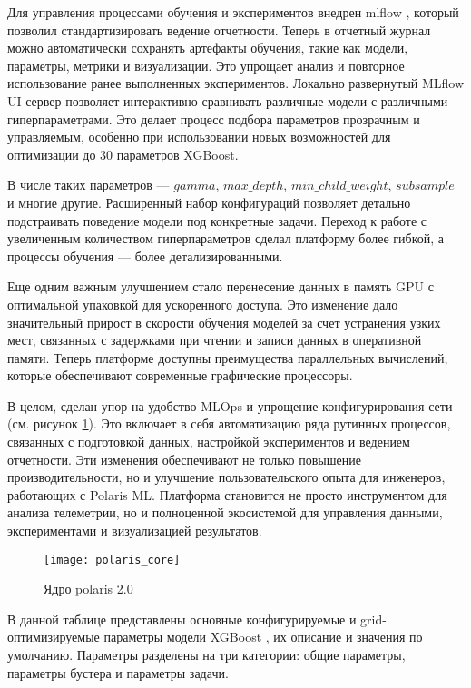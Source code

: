 Для управления процессами обучения и экспериментов внедрен mlflow \cite{mlflow_docs}, который позволил стандартизировать ведение отчетности. Теперь в отчетный журнал можно автоматически сохранять артефакты обучения, такие как модели, параметры, метрики и визуализации. Это упрощает анализ и повторное использование ранее выполненных экспериментов. Локально развернутый MLflow UI-сервер позволяет интерактивно сравнивать различные модели с различными гиперпараметрами. Это делает процесс подбора параметров прозрачным и управляемым, особенно при использовании новых возможностей для оптимизации до 30 параметров XGBoost.

В числе таких параметров — $gamma$, $max\_depth$, $min\_child\_weight$, $subsample$ и многие другие. Расширенный набор конфигураций позволяет детально подстраивать поведение модели под конкретные задачи. Переход к работе с увеличенным количеством гиперпараметров сделал платформу более гибкой, а процессы обучения — более детализированными.

Еще одним важным улучшением стало перенесение данных в память GPU с оптимальной упаковкой для ускоренного доступа. Это изменение дало значительный прирост в скорости обучения моделей за счет устранения узких мест, связанных с задержками при чтении и записи данных в оперативной памяти. Теперь платформе доступны преимущества параллельных вычислений, которые обеспечивают современные графические процессоры.

В целом, сделан упор на удобство MLOps и упрощение конфигурирования сети (см. рисунок \ref{fig:polaris_core}). Это включает в себя автоматизацию ряда рутинных процессов, связанных с подготовкой данных, настройкой экспериментов и ведением отчетности. Эти изменения обеспечивают не только повышение производительности, но и улучшение пользовательского опыта для инженеров, работающих с Polaris ML. Платформа становится не просто инструментом для анализа телеметрии, но и полноценной экосистемой для управления данными, экспериментами и визуализацией результатов.

\begin{figure}[H]
	\centering
	\texttt{[image: polaris\_core]}
	\caption{Ядро polaris 2.0}
	\label{fig:polaris_core}
\end{figure}

В данной таблице представлены основные конфигурируемые и grid-оптимизируемые параметры модели XGBoost \cite{xgboost_parameters_docs}, их описание и значения по умолчанию. Параметры разделены на три категории: общие параметры, параметры бустера и параметры задачи.

